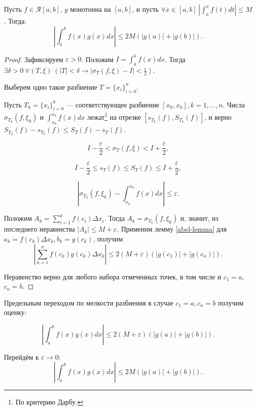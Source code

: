 \label{abel-lemma}
\begin{lemma}[Абель]
    Пусть $f \in \mathcal{R}[a, b]$, $g$ монотонна на $[a, b]$, и пусть $\forall x \in [a, b] \ \left|\int_a^x f(t) dt\right| \le M$. Тогда:
    \[
        \left|\int_a^b f(x) g(x) dx\right| \le 2M(|g(a)| + |g(b)|).
    \]

    \begin{proof}
        Зафиксируем $\varepsilon > 0$. Положим $I = \int_a^b f(x) dx$. Тогда $\exists \delta > 0 \ \forall (T, \xi) \ (|T| < \delta \rightarrow |\sigma_T (f, \xi) - I| < \frac{\varepsilon}{2})$.

        Выберем одно такое разбиение $T = \{x_i\}_{i=0}^{n}$.

        Пусть $T_k = \{x_i\}_{i=0}^k$ --- соответствующее разбиение $[x_0, x_k], k = 1, \ldots, n$. Числа $\sigma_{T_k} (f, \xi_k)$ и $\int_{x_0}^{x_k} f(x) dx$ лежат\footnote{По критерию Дарбу.} на отрезке $[s_{T_k}(f), S_{T_k}(f)]$, и верно $S_{T_k}(f) - s_{T_k}(f) \le S_T(f) - s_T(f)$.

        \[
            I - \frac{\varepsilon}{2} < \sigma_T (f, \xi) < I + \frac{\varepsilon}{2} ,
        \]

        \[
            I - \frac{\varepsilon}{2} \le s_T(f) \le S_T(f) \le I + \frac{\varepsilon}{2},
        \]

        \[
            \left|\sigma_{T_k} (f, \xi_k) - \int_{x_0}^{x_k} f(x) dx\right| \le \varepsilon.
        \]

        Положим $A_k = \sum_{i = 1}^k f(c_i) \Delta x_i.$ Тогда $A_k = \sigma_{T_k}(f, \xi_k)$ и, значит, из последнего неравенства $|A_k| \le M + \varepsilon$.
        Применим лемму \ref{abel-lemma} для $a_k = f(c_k) \Delta x_k, b_k = g(c_k)$, получим
        \[
            \left|\sum_{k=1}^n f(c_k) g(c_k) \Delta x_k\right| \le 2(M + \varepsilon)(|g(c_1)| + |g(c_n)|).
        \]

        Неравенство верно для любого набора отмеченных точек, в том числе и $c_1 = a$, $c_n = b$.
    \end{proof}
\end{lemma}

\begin{note}
    Предельным переходом по мелкости разбиения в случае $c_1 = a, c_n = b$ получим оценку:

    \[
        \left|\int_a^b f(x) g(x) dx\right| \le 2(M + \varepsilon)\left(|g(a)| + |g(b)|\right).
    \]

    Перейдём к $\varepsilon \rightarrow 0$:
    \[
        \left|\int_a^b f(x) g(x) dx\right| \le 2M\left(|g(a)| + |g(b)|\right).
    \]
\end{note}


